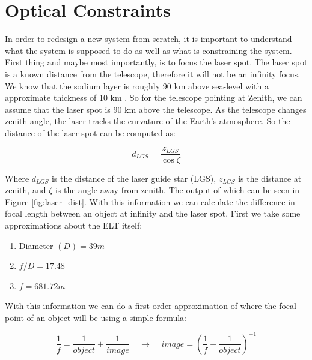 \section{Optical Constraints}
\label{optical_constraints}

In order to redesign a new system from scratch, it is important to understand what
the system is supposed to do as well as what is constraining the system.  First
thing and maybe most importantly, is to focus the laser spot.  The laser spot is a
known distance from the telescope, therefore it will not be an infinity focus.  We
know that the sodium layer is roughly 90 km above sea-level with a approximate
thickness of 10 km \cite{sodium}.  So for the telescope pointing at Zenith, we can
assume that the laser spot is 90 km above the telescope.  As the telescope changes
zenith angle, the laser tracks the curvature of the Earth's atmosphere.  So the
distance of the laser spot can be computed as:

\begin{equation}
    d_{LGS} = \frac{z_{LGS}}{\cos \zeta}
\end{equation}

Where $d_{LGS}$ is the distance of the laser guide star (LGS), $z_{LGS}$ is the
distance at zenith, and $\zeta$ is the angle away from zenith.  The output of which
can be seen in Figure \ref{fig:laser_dist}.  With this information we can calculate
the difference in focal length between an object at infinity and the laser spot. 
First we take some approximations about the ELT itself:

\begin{enumerate}
    \item Diameter $(D) = 39m$
    \item $f/D = 17.48$
    \item $f = 681.72m$
\end{enumerate}

With this information we can do a first order approximation of where the focal point
of an object will be using a simple formula:

\begin{equation}
    \frac{1}{f} = \frac{1}{object} + \frac{1}{image} \;\;\;\; \rightarrow \;\;\;\; image = \left(\frac{1}{f} - \frac{1}{object}\right)^{-1}
    \label{eq:img_dist}
\end{equation}

